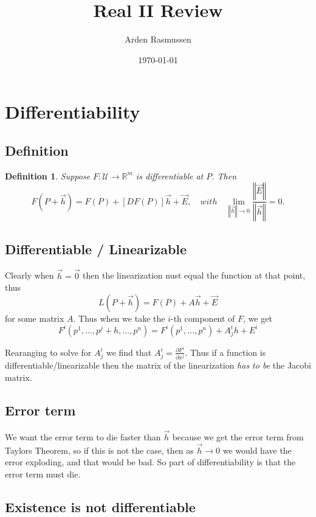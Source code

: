 \documentclass[12pt]{amsart}
\title{Real II Review}
\author{Arden Rasmussen}
\date{\today}
\newtheorem{definition}{Definition}[section]
\newcommand{\U}{\mathcal{U}}
\newcommand{\ra}{\rightarrow}
\newcommand{\R}{\mathbb{R}}
\newcommand{\abs}[1]{\left\Vert{#1}\right\Vert}
\newcommand{\pder}[2]{\frac{\partial #1}{\partial #2}}
\begin{document}
\maketitle

\section{Differentiability}%
\label{sec:differentiability}

\subsection{Definition}%
\label{sub:definition}

\begin{definition}
  Suppose $F:\U\ra\R^m$ is differentiable at $P$. Then
  \[
    F(P+\vec{h})=F(P)+[DF(P)]\vec{h}+\vec{E},\quad with\quad
    \lim_{\abs{\vec{h}}\ra 0}\frac{\abs{\vec{E}}}{\abs{\vec{h}}}=0.
  \]
\end{definition}

\subsection{Differentiable / Linearizable}%
\label{sub:differentiable_linearizable}

Clearly when $\vec{h}=\vec{0}$ then the linearization nust equal the function
at that point, thus \[L(P+\vec{h})=F(P)+A\vec{h}+\vec{E}\] for some matrix $A$.
Thus when we take the $i$-th component of $F$, we get
\[
  F^i(p^1,\ldots,p^j+h,\ldots,p^n)=F^i(p^1,\ldots,p^n)+A_j^ih+E^i
\]

Rearanging to solve for $A_j^i$ we find that $A_j^i=\pder{F^i}{x^j}$. Thus if a
function is differentiable/linearizable then the matrix of the linearization
\textit{has to be} the Jacobi matrix.

\subsection{Error term}%
\label{sub:error_term}

We want the error term to die faster than $\vec{h}$ because we get the error
term from Taylors Theorem, so if this is not the case, then as $\vec{h}\ra0$ we
would have the error exploding, and that would be bad. So part of
differentiability is that the error term must die.

\subsection{Existence is not differentiable}%
\label{sub:existance_is_not_differentiable}
\end{document}
